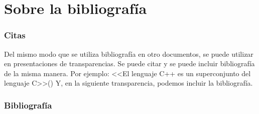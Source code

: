 \documentclass{beamer}
\begin{document}
    \section{Sobre la bibliografía}
    \begin{frame}
        \frametitle{Citas}
        Del mismo modo que se utiliza bibliografía en otro documentos, se
        puede utilizar en presentaciones de transparencias. Se puede citar y se
        puede incluir bibliografía de la misma manera. Por ejemplo:
        <<El lenguaje C++ es un superconjunto del lenguaje C>>(\cite{cpppl})
        Y, en la siguiente transparencia, podemos incluir la bibliografía.
    \end{frame}
    \begin{frame}
        \frametitle{Bibliografía}
        \printbibliography
    \end{frame}
\end{document}
